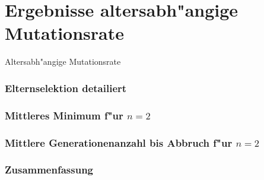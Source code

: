 \documentclass[]{beamer}
\begin{document}
\section{Ergebnisse altersabh"angige Mutationsrate}

\begin{frame}
    
    \begin{center}
	\LARGE{Altersabh"angige Mutationsrate}
    \end{center}

\end{frame}

\begin{frame}\frametitle{Elternselektion detailiert} 

\end{frame}

\begin{frame}\frametitle{Mittleres Minimum f"ur $n = 2$} 

\end{frame}

\begin{frame}\frametitle{Mittlere Generationenanzahl bis Abbruch f"ur $n = 2$} 

\end{frame}

\begin{frame}\frametitle{Zusammenfassung}

\end{frame}
\end{document}
